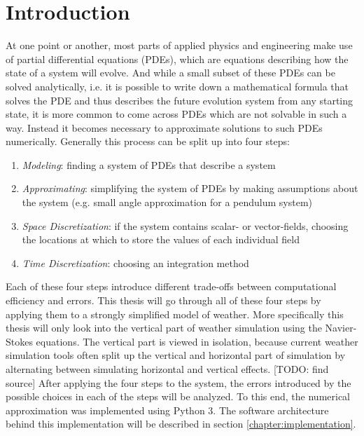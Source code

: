 
\chapter{Introduction}\label{chapter:introduction}

At one point or another, most parts of applied physics and engineering make use of partial differential equations (PDEs), which are equations describing how the state of a system will evolve.
And while a small subset of these PDEs can be solved analytically, i.e. it is possible to write down a mathematical formula that solves the PDE and thus describes the future evolution system from any starting state, it is more common to come across PDEs which are not solvable in such a way.
Instead it becomes necessary to approximate solutions to such PDEs numerically.
Generally this process can be split up into four steps:
\begin{enumerate}
\item \emph{Modeling}: finding a system of PDEs that describe a system
\item \emph{Approximating}: simplifying the system of PDEs by making assumptions about the system (e.g. small angle approximation for a pendulum system)
\item \emph{Space Discretization}: if the system contains scalar- or vector-fields, choosing the locations at which to store the values of each individual field
\item \emph{Time Discretization}: choosing an integration method
\end{enumerate}
Each of these four steps introduce different trade-offs between computational efficiency and errors.
This thesis will go through all of these four steps by applying them to a strongly simplified model of weather.
More specifically this thesis will only look into the vertical part of weather simulation using the Navier-Stokes equations.
The vertical part is viewed in isolation, because current weather simulation tools often split up the vertical and horizontal part of simulation by alternating between simulating horizontal and vertical effects. [TODO: find source]
After applying the four steps to the system, the errors introduced by the possible choices in each of the steps will be analyzed.
To this end, the numerical approximation was implemented using Python 3.
The software architecture behind this implementation will be described in section \ref{chapter:implementation}.